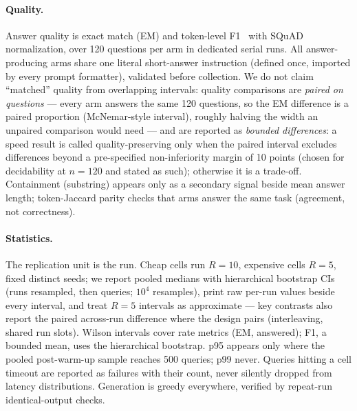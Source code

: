 \paragraph{Quality.} Answer quality is exact match (EM) and token-level
F1~\cite{rajpurkar2016squad} with SQuAD normalization, over 120 questions
per arm in dedicated serial runs. All answer-producing arms share one
literal short-answer instruction (defined once, imported by every prompt
formatter), validated before collection. We do not claim ``matched''
quality from overlapping intervals: quality comparisons are \emph{paired on questions} --- every arm answers
the same 120 questions, so the EM difference is a paired proportion
(McNemar-style interval), roughly halving the width an unpaired comparison
would need --- and are reported as \emph{bounded differences}: a speed
result is called quality-preserving only when the paired interval excludes
differences beyond a pre-specified non-inferiority margin of 10 points
(chosen for decidability at $n{=}120$ and stated as such); otherwise it is
a trade-off. Containment (substring) appears only as a secondary
signal beside mean answer length; token-Jaccard parity checks that arms
answer the same task (agreement, not correctness).

\paragraph{Statistics.} The replication unit is the run. Cheap cells run
$R{=}10$, expensive cells $R{=}5$, fixed distinct seeds; we report pooled
medians with hierarchical bootstrap CIs (runs resampled, then queries;
$10^4$ resamples), print raw per-run values beside every interval, and
treat $R{=}5$ intervals as approximate --- key contrasts also report the
paired across-run difference where the design pairs (interleaving, shared
run slots). Wilson intervals cover rate metrics (EM, answered); F1, a
bounded mean, uses the hierarchical bootstrap. p95 appears only where the
pooled post-warm-up sample reaches 500 queries; p99 never. Queries hitting
a cell timeout are reported as failures with their count, never silently
dropped from latency distributions. Generation is greedy everywhere,
verified by repeat-run identical-output checks.


